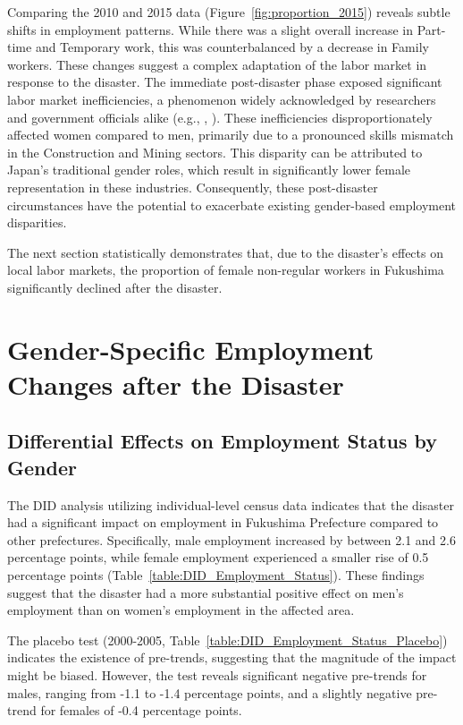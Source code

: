 \documentclass[a4paper,12pt]{article}
\begin{document}
Comparing the 2010 and 2015 data (Figure~\ref{fig:proportion_2015}) reveals subtle shifts in employment patterns. While there was a slight overall increase in Part-time and Temporary work, this was counterbalanced by a decrease in Family workers. These changes suggest a complex adaptation of the labor market in response to the disaster. The immediate post-disaster phase exposed significant labor market inefficiencies, a phenomenon widely acknowledged by researchers and government officials alike (e.g., \citet{Kondo2017TheWorkers}, \citet{Umezawa2014TheGovernment}). These inefficiencies disproportionately affected women compared to men, primarily due to a pronounced skills mismatch in the Construction and Mining sectors. This disparity can be attributed to Japan's traditional gender roles, which result in significantly lower female representation in these industries. Consequently, these post-disaster circumstances have the potential to exacerbate existing gender-based employment disparities.

The next section statistically demonstrates that, due to the disaster's effects on local labor markets, the proportion of female non-regular workers in Fukushima significantly declined after the disaster.

\section{Gender-Specific Employment Changes after the Disaster}
\subsection{Differential Effects on Employment Status by Gender}

The DID analysis utilizing individual-level census data indicates that the disaster had a significant impact on employment in Fukushima Prefecture compared to other prefectures. Specifically, male employment increased by between 2.1 and 2.6 percentage points, while female employment experienced a smaller rise of 0.5 percentage points (Table~\ref{table:DID_Employment_Status}). These findings suggest that the disaster had a more substantial positive effect on men's employment than on women's employment in the affected area.

The placebo test (2000-2005, Table~\ref{table:DID_Employment_Status_Placebo}) indicates the existence of pre-trends, suggesting that the magnitude of the impact might be biased. However, the test reveals significant negative pre-trends for males, ranging from -1.1 to -1.4 percentage points, and a slightly negative pre-trend for females of -0.4 percentage points.
\end{document}
